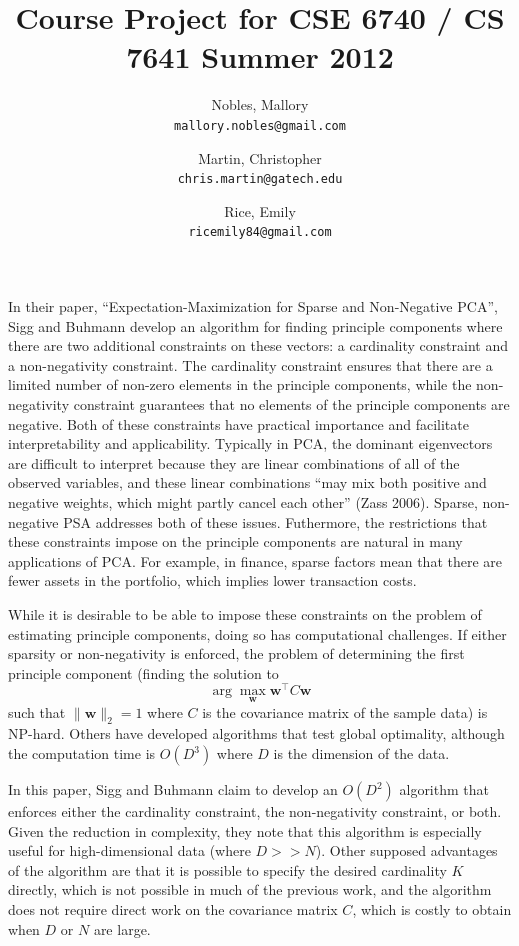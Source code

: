\documentclass{article}
\title{Course Project for CSE 6740 / CS 7641 Summer 2012}
\author{Nobles, Mallory \\ \texttt{mallory.nobles@gmail.com}
  \and Martin, Christopher \\ \texttt{chris.martin@gatech.edu}
  \and Rice, Emily \\ \texttt{ricemily84@gmail.com} }
\date{}
\begin{document}
\maketitle

In their paper, ``Expectation-Maximization for Sparse and Non-Negative PCA'',
Sigg and Buhmann develop an algorithm for finding principle components where
there are two additional constraints on these vectors:
a cardinality constraint and a non-negativity constraint.
The cardinality constraint ensures that there are a limited number
of non-zero elements in the principle components, while
the non-negativity constraint guarantees that no elements of
the principle components are negative.
Both of these constraints have practical importance and facilitate
interpretability and applicability.
Typically in PCA, the dominant eigenvectors are difficult to interpret
because they are linear combinations of all of the observed variables,
and these linear combinations ``may mix both positive and negative weights,
which might partly cancel each other'' (Zass 2006).
Sparse, non-negative PSA addresses both of these issues.
Futhermore, the restrictions that these constraints impose on the
principle components are natural in many applications of PCA.
For example, in finance, sparse factors mean that there are
fewer assets in the portfolio, which implies lower transaction costs.

While it is desirable to be able to impose these constraints on
the problem of estimating principle components, doing so has
computational challenges. If either sparsity or non-negativity
is enforced, the problem of determining the first principle component
(finding the solution to
\[ \arg\max_{\mathbf{w}} \mathbf{w}^\intercal C\mathbf{w} \]
such that $\|\mathbf{w}\|_2 = 1$
where $C$ is the covariance matrix of the sample data) is NP-hard.
Others have developed algorithms that test global optimality, although
the computation time is $O(D^3)$ where $D$ is the dimension of the data.

In this paper, Sigg and Buhmann claim to develop an $O(D^2)$ algorithm
that enforces either the cardinality constraint,
the non-negativity constraint, or both.
Given the reduction in complexity, they note that this algorithm is
especially useful for high-dimensional data (where $D >> N$).
Other supposed advantages of the algorithm are that it is possible
to specify the desired cardinality $K$ directly, which is not possible
in much of the previous work, and the algorithm does not require
direct work on the covariance matrix $C$, which is costly to obtain
when $D$ or $N$ are large.
\end{document}
